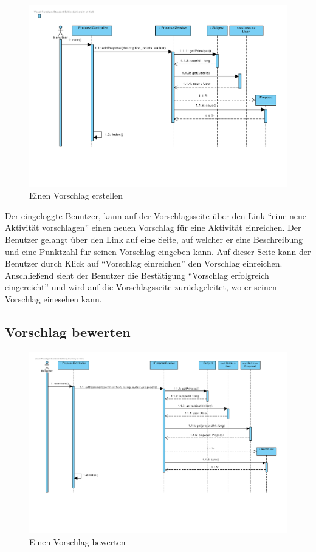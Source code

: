 \begin{figure}[H]
  \centering
  \includegraphics[width=16cm, trim= 2cm 4cm 1cm 1cm, clip, angle=90]{gfx/vorschlag_erstellen}
  \caption{Einen Vorschlag erstellen}
\end{figure}

Der eingeloggte Benutzer, kann auf der Vorschlagsseite über den Link
``eine neue Aktivität vorschlagen'' einen neuen Vorschlag für eine
Aktivität einreichen. Der Benutzer gelangt über den Link auf eine
Seite, auf welcher er eine Beschreibung und eine Punktzahl für seinen Vorschlag
 eingeben kann. Auf dieser Seite kann der Benutzer durch Klick auf
 ``Vorschlag einreichen'' den Vorschlag einreichen. Anschließend sieht
 der Benutzer die Bestätigung ``Vorschlag erfolgreich eingereicht''
 und wird auf die Vorschlagsseite zurückgeleitet, wo er seinen
 Vorschlag einesehen kann.
 
\subsection{Vorschlag bewerten}

\begin{figure}[H]
  \centering
  \includegraphics[width=16cm, trim= 1cm 4cm 1cm 1cm, clip, angle=90]{gfx/vorschlag_bewerten}
  \caption{Einen Vorschlag bewerten}
\end{figure}

